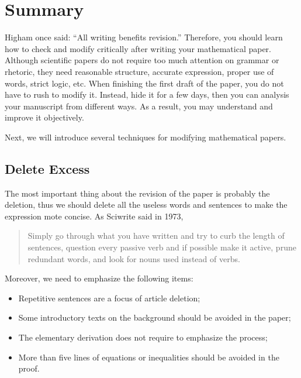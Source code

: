


\section{Summary}
Higham once said: ``All writing benefits revision.''\cite{Nicholas1998Handbook} Therefore, you should learn how to check and modify critically after writing your mathematical paper. Although scientific papers do not require too much attention on grammar or rhetoric, they need reasonable structure, accurate expression, proper use of words, strict logic, etc.
When finishing the first draft of the paper, you do not have to rush to modify it. Instead, hide it for a few days, then you can analysis your manuscript from different ways. As a result, you may understand and improve it objectively.

Next, we will introduce several techniques for modifying mathematical papers.
\subsection{Delete Excess}
The most important thing about the revision of the paper is probably the deletion, thus we should delete all the useless words and sentences to make the expression mote concise. As Sciwrite said in 1973,
\begin{quotation}
	Simply go through what you have written and try to curb the length of sentences, question every passive verb and if possible make it active, prune redundant words, and look for nouns used instead of verbs.
\end{quotation}

Moreover, we need to emphasize the following items:
\begin{itemize}
	\item Repetitive sentences are a focus of article deletion;
	\item Some introductory texts on the background should be avoided in the paper;
	\item The elementary derivation does not require to emphasize the process;
	\item More than five lines of equations or inequalities should be avoided in the proof.
\end{itemize}


